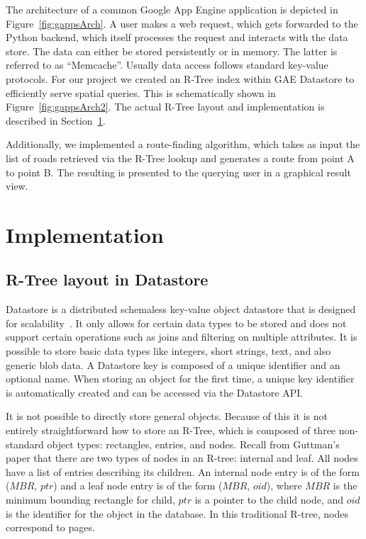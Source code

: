 \documentclass{scrartcl}
\begin{document}
The architecture of a common Google App Engine application is depicted in Figure~\ref{fig:gappsArch}. A user makes a web request, which gets forwarded to the Python backend, which itself processes the request and interacts with the data store. The data can either be stored persistently or in memory. The latter is referred to as ``Memcache''. Usually data access follows standard key-value protocols. For our project we created an R-Tree index within GAE Datastore to efficiently serve spatial queries. This is schematically shown in Figure~\ref{fig:gappsArch2}. The actual R-Tree layout and implementation is described in Section~\ref{sec:implementation}.

Additionally, we implemented a route-finding algorithm, which takes as input the list of roads retrieved via the R-Tree lookup and generates a route from point A to point B. The resulting is presented to the querying user in a graphical result view.

\section{Implementation}
\label{sec:implementation}
\subsection{R-Tree layout in Datastore}
Datastore is a distributed schemaless key-value object datastore that is designed for scalability~\cite{datastore}. It only allows for certain data types to be stored and does not support certain operations such as joins and filtering on multiple attributes. It is possible to store basic data types like integers, short strings, text, and also generic blob data. A Datastore key is composed of a unique identifier and an optional name. When storing an object for the first time, a unique key identifier is automatically created and can be accessed via the Datastore API. 

It is not possible to directly store general objects. Because of this it is not entirely straightforward how to store an R-Tree, which is composed of three non-standard object types: rectangles, entries, and nodes. Recall from Guttman's paper\cite{DBLP:conf/sigmod/Guttman84} that there are two types of nodes in an R-tree: internal and leaf. All nodes have a list of entries describing its children. An internal node entry is of the form ($MBR$, $ptr$) and a leaf node entry is of the form ($MBR$, $oid$), where $MBR$ is the minimum bounding rectangle for child, $ptr$ is a pointer to the child node, and $oid$ is the identifier for the object in the database. In this traditional R-tree, nodes correspond to pages.
\end{document}
